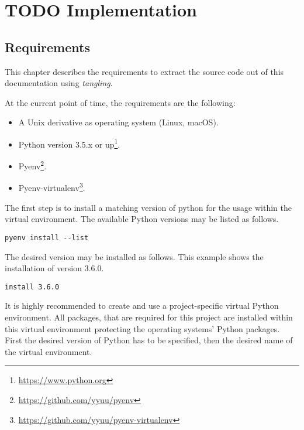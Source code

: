 \documentclass[10pt, openright, notitlepage]{scrreprt}
\begin{document}
\chapter{{\bfseries\sffamily TODO} Implementation}
\label{sec:orgd2de195}

\section{Requirements}
\label{sec:orgc325c28}

This chapter describes the requirements to extract the source code out of this
documentation using \emph{tangling}.

At the current point of time, the requirements are the following:

\begin{itemize}
\item A Unix derivative as operating system (Linux, macOS).
\item Python version 3.5.x or up\footnote{\url{https://www.python.org}}.
\item Pyenv\footnote{\url{https://github.com/yyuu/pyenv}}.
\item Pyenv-virtualenv\footnote{\url{https://github.com/yyuu/pyenv-virtualenv}}.
\end{itemize}

The first step is to install a matching version of python for the usage within
the virtual environment. The available Python versions may be listed as follows.

\begin{listing}[H]
\begin{verbatim}
pyenv install --list
\end{verbatim}
\caption{\label{org0db936b}
Listing all available versions of Python for use in Pyenv.}
\end{listing}

The desired version may be installed as follows. This example shows the
installation of version 3.6.0.

\begin{listing}[H]
\begin{verbatim}
install 3.6.0
\end{verbatim}
\caption{\label{orge7367a0}
Installation of Python version 3.6.0 for the usage with Pyenv.}
\end{listing}

It is highly recommended to create and use a project-specific virtual Python
environment. All packages, that are required for this project are installed
within this virtual environment protecting the operating systems' Python
packages.
First the desired version of Python has to be specified, then the desired name
of the virtual environment.
\end{document}
